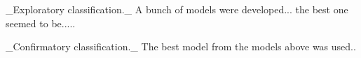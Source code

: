 

_Exploratory classification._ A bunch of models were developed... the best one seemed to be.....


_Confirmatory classification._ The best model from the models above was used..